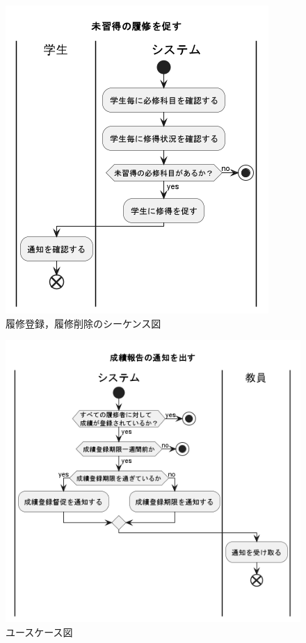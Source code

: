 \documentclass[documentclass]{jsarticle}
\begin{document}
\begin{figure}[H]
\begin{minipage}[b]{0.49\columnwidth}
      \includegraphics[width=1.0\columnwidth]{figure/7-6.png}
      \caption{履修登録，履修削除のシーケンス図}
      \label{fig:7-6}
  \end{minipage}
\end{figure}

\begin{figure}[H]
  \begin{center}
    \includegraphics*[scale=0.4]{figure/7-7.png}
  \end{center}
  \caption{ユースケース図}
  \label{fig:7-7}
\end{figure}
\newpage
\end{document}
